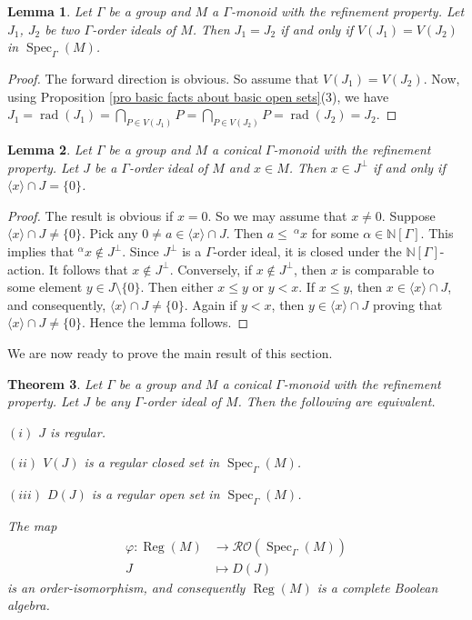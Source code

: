 \documentclass[a4paper,reqno,12pt]{amsart}
\numberwithin{equation}{section}
\newtheorem{thm}{Theorem}[section]
\newtheorem{lem}[thm]{Lemma}
\theoremstyle{definition}
\theoremstyle{remark}
\newcommand{\rad}{\operatorname{rad}}
\newcommand{\Spec}{\operatorname{Spec}}
\newcommand{\reg}{\operatorname{Reg}}
\begin{document}
\begin{lem}\label{lem V(I)=V(J) implies I=J}
Let $\Gamma$ be a group and $M$ a $\Gamma$-monoid with the refinement property. Let $J_1$, $J_2$ be two $\Gamma$-order ideals of $M$. Then $J_1=J_2$ if and only if $V(J_1)=V(J_2)$ in $\Spec_\Gamma(M)$.    
\end{lem}
\begin{proof}
The forward direction is obvious. So assume that $V(J_1)=V(J_2)$. Now, using Proposition \ref{pro basic facts about basic open sets}(3), we have $J_1=\rad(J_1)=\displaystyle{\bigcap_{P\in V(J_1)}}P=\displaystyle{\bigcap_{P\in V(J_2)}}P=\rad(J_2)=J_2$.
\end{proof}
\begin{lem}\label{lem perp via intersection}
Let $\Gamma$ be a group and $M$ a conical $\Gamma$-monoid with the refinement property. Let $J$ be a $\Gamma$-order ideal of $M$ and $x\in M$. Then $x\in J^\perp$ if and only if $\langle x \rangle \cap J=\{0\}$.     
\end{lem}
\begin{proof}
The result is obvious if $x=0$. So we may assume that $x\neq 0$. Suppose $\langle x\rangle \cap J\neq \{0\}$. Pick any $0\neq a\in \langle x\rangle \cap J$. Then $a\le~^\alpha x$ for some $\alpha\in \mathbb{N}[\Gamma]$. This implies that $^\alpha x\notin J^\perp$. Since $J^\perp$ is a $\Gamma$-order ideal, it is closed under the $\mathbb{N}[\Gamma]$-action. It follows that $x\notin J^\perp$. Conversely, if $x\notin J^\perp$, then $x$ is comparable to some element $y\in J\setminus \{0\}$. Then either $x\le y$ or $y<x$. If $x\le y$, then $x\in \langle x\rangle \cap J$, and consequently, $\langle x\rangle \cap J\neq \{0\}$. Again if $y< x$, then $y\in \langle x\rangle \cap J$ proving that $\langle x \rangle \cap J\neq \{0\}$. Hence the lemma follows.  
\end{proof}
We are now ready to prove the main result of this section.
\begin{thm}\label{th regular ideals via the prime spectrum}
Let $\Gamma$ be a group and $M$ a conical $\Gamma$-monoid with the refinement property. Let $J$ be any $\Gamma$-order ideal of $M$. Then the following are equivalent.

$(i)$ $J$ is regular.

$(ii)$ $V(J)$ is a regular closed set in $\Spec_\Gamma(M)$.

$(iii)$ $D(J)$ is a regular open set in $\Spec_\Gamma(M)$.

The map 
\begin{align*}
\varphi:\reg(M)&\longrightarrow \mathcal{R}\mathcal{O}(\Spec_\Gamma(M))\\
J&\longmapsto D(J)
\end{align*}
is an order-isomorphism, and consequently $\reg(M)$ is a complete Boolean algebra. 
\end{thm}
\end{document}
